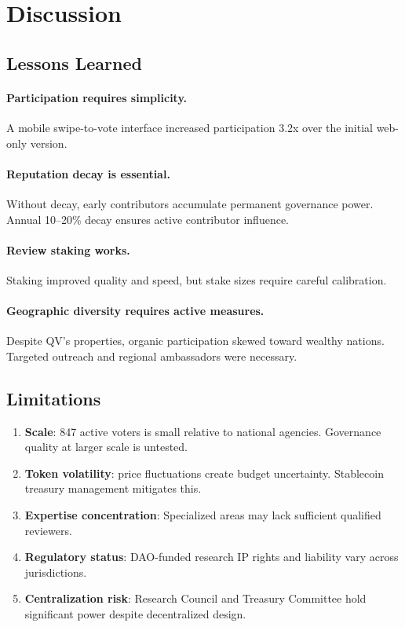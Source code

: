 \section{Discussion}

\label{sec:discussion}

\subsection{Lessons Learned}

\paragraph{Participation requires simplicity.} A mobile swipe-to-vote
interface increased participation 3.2x over the initial web-only version.

\paragraph{Reputation decay is essential.} Without decay, early
contributors accumulate permanent governance power. Annual 10--20\% decay
ensures active contributor influence.

\paragraph{Review staking works.} Staking improved quality and speed,
but stake sizes require careful calibration.

\paragraph{Geographic diversity requires active measures.} Despite QV's
properties, organic participation skewed toward wealthy nations. Targeted
outreach and regional ambassadors were necessary.

\subsection{Limitations}

\begin{enumerate}
  \item \textbf{Scale}: 847 active voters is small relative to national
    agencies. Governance quality at larger scale is untested.
  \item \textbf{Token volatility}: \ZOO{} price fluctuations create
    budget uncertainty. Stablecoin treasury management mitigates this.
  \item \textbf{Expertise concentration}: Specialized areas may lack
    sufficient qualified reviewers.
  \item \textbf{Regulatory status}: DAO-funded research IP rights and
    liability vary across jurisdictions.
  \item \textbf{Centralization risk}: Research Council and Treasury
    Committee hold significant power despite decentralized design.
\end{enumerate}


